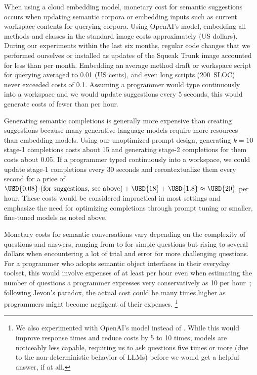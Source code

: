 When using a cloud embedding model, monetary cost for semantic suggestions occurs when updating semantic corpora or embedding inputs such as current workspace contents for querying corpora.
Using OpenAI's  model, embedding all methods and classes in the standard image costs approximately  (US dollars).
During our experiments within the last six months, regular code changes that we performed ourselves or installed as updates of the Squeak Trunk image accounted for less than  per month.
Embedding an average method draft or workspace script for querying averaged to \qty{0.01}{\cent} (US cents), and even long scripts (\qty{200}{SLOC}) never exceeded costs of \qty{0.1}{\cent}.
Assuming a programmer would type continuously into a workspace and we would update suggestions every 5 seconds, this would generate costs of fewer than  per hour.

Generating semantic completions is generally more expensive than creating suggestions because many generative language models require more resources than embedding models.
Using our unoptimized prompt design, generating $k = 10$ stage-1 completions costs about \qty{15}{\cent} and generating stage-2 completions for them costs about \qty{0.05}{\cent}.
If a programmer typed continuously into a workspace, we could update stage-1 completions every 30 seconds and recontextualize them every second for a price of $\USD{0.08}\text{ (for suggestions, see above)} + \USD{18} + \USD{1.8} \approx \USD{20}$ per hour.
These costs would be considered impractical in most settings and emphasize the need for optimizing completions through prompt tuning or smaller, fine-tuned models as noted above.

Monetary costs for semantic conversations vary depending on the complexity of questions and answers, ranging from  to  for simple questions but rising to several dollars when encountering a lot of trial and error for more challenging questions.
For a programmer who adopts semantic object interfaces in their everyday toolset, this would involve expenses of at least  per hour even when estimating the number of questions a programmer expresses very conservatively as 10 per hour~\cite{kubelka2018road}; following Jevon's paradox, the actual cost could be many times higher as programmers might become negligent of their expenses.%
\footnote{%
	We also experimented with OpenAI's  model instead of .
	While this would improve response times and reduce costs by 5 to 10 times, \gptthreefive models are noticeably less capable, requiring us to ask questions five times or more (due to the non-deterministic behavior of LLMs) before we would get a helpful answer, if at all.
}

